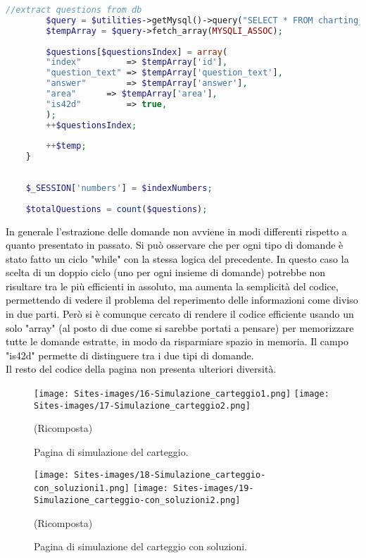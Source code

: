 \begin{lstlisting}[language=php]
		//extract questions from db
		$query = $utilities->getMysql()->query("SELECT * FROM charting_test_42d WHERE (id = '{$indexNumbers['42d'][$temp]}')");
		$tempArray = $query->fetch_array(MYSQLI_ASSOC);  
		
		$questions[$questionsIndex] = array(
		"index"         => $tempArray['id'],
		"question_text" => $tempArray['question_text'],
		"answer"        => $tempArray['answer'],
		"area"		=> $tempArray['area'],	
		"is42d"         => true,
		);
		++$questionsIndex;
		
		++$temp;
	}
	
	
	$_SESSION['numbers'] = $indexNumbers;
	
	$totalQuestions = count($questions);
\end{lstlisting}
\textcolor{black}{In generale l'estrazione delle domande non avviene in modi differenti rispetto a quanto presentato in passato. Si può osservare che per ogni tipo di domande è stato fatto un ciclo "while" con la stessa logica del precedente. In questo caso la scelta di un doppio ciclo (uno per ogni insieme di domande) potrebbe non risultare tra le più efficienti in assoluto, ma aumenta la semplicità del codice, permettendo di vedere il problema del reperimento delle informazioni come diviso in due parti. Però si è comunque cercato di rendere il codice efficiente usando un solo "array" (al posto di due come si sarebbe portati a pensare) per memorizzare tutte le domande estratte, in modo da risparmiare spazio in memoria. Il campo "is42d" permette di distinguere tra i due tipi di domande.\\
Il resto del codice della pagina non presenta ulteriori diversità.}\\

\begin{figure}[h]
	\begin{center}
		\texttt{[image: Sites-images/16-Simulazione\_carteggio1.png]}
			\texttt{[image: Sites-images/17-Simulazione\_carteggio2.png]}
		\caption{Pagina di simulazione del carteggio.}
		(Ricomposta)
	\end{center}
\end{figure}

\begin{figure}[h]
	\begin{center}
		\texttt{[image: Sites-images/18-Simulazione\_carteggio-con\_soluzioni1.png]}
		\texttt{[image: Sites-images/19-Simulazione\_carteggio-con\_soluzioni2.png]}
		\caption{Pagina di simulazione del carteggio con soluzioni.}
		(Ricomposta)
	\end{center}
\end{figure}

